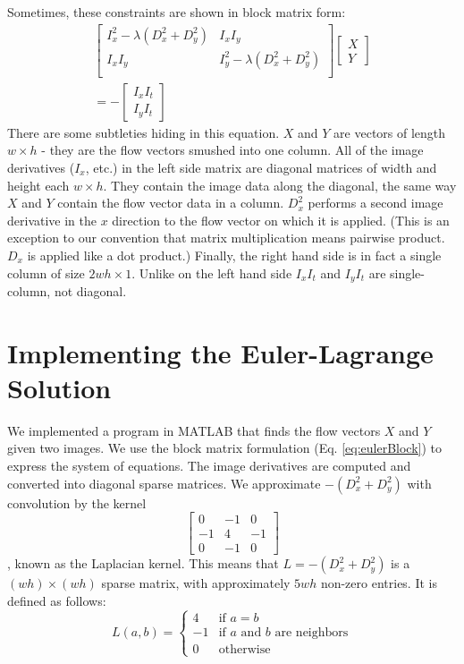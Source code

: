 \documentclass[10pt,twocolumn,letterpaper]{article}
\begin{document}
Sometimes, these constraints are shown in block matrix form:
\begin{multline} \label{eq:eulerBlock}
\left[ \begin{array}{cc}
I_x^2 - \lambda (D_x^2 + D_y^2) & I_x I_y\\
I_x I_y & I_y^2 - \lambda (D_x^2 + D_y^2) \\
\end{array} \right]
\left[\begin{array}{c}
X \\
Y
\end{array} \right] \\
=-\left[ \begin{array}{c}
I_x I_t \\
I_y I_t
\end{array} \right]
\end{multline}
There are some subtleties hiding in this equation.  $X$ and $Y$ are vectors of length $w \times h$ - they are the flow vectors smushed into one column.  All of the image derivatives ($I_x$, etc.) in the left side matrix are diagonal matrices of width and height each $w \times h$.  They contain the image data along the diagonal, the same way $X$ and $Y$ contain the flow vector data in a column.  $D_x^2$ performs a second image derivative in the $x$ direction to the flow vector on which it is applied.  (This is an exception to our convention that matrix multiplication means pairwise product.  $D_x$ is applied like a dot product.)  Finally, the right hand side is in fact a single column of size $2wh \times 1$.  Unlike on the left hand side $I_x I_t$ and $I_y I_t$ are single-column, not diagonal.

\section{Implementing the Euler-Lagrange Solution}

We implemented a program in MATLAB that finds the flow vectors $X$ and $Y$ given two images.  We use the block matrix formulation (Eq. \ref{eq:eulerBlock}) to express the system of equations.  The image derivatives are computed and converted into diagonal sparse matrices.  We approximate $-(D_x^2 + D_y^2)$ with convolution by the kernel
\begin{equation} \label{eq:laplacian}
\left[ \begin{array}{ccc}
0 & -1 & 0 \\
-1 & 4 & -1 \\
0 & -1 & 0
\end{array} \right]
\end{equation}
, known as the Laplacian kernel.  This means that $L = -(D_x^2 + D_y^2)$ is a $(wh) \times (wh)$ sparse matrix, with approximately $5wh$ non-zero entries.  It is defined as follows:
\begin{equation} \label{eq:laplacian2}
L(a, b) = \begin{cases}
4 & \text{if } a = b \\
-1 & \text{if $a$ and $b$ are neighbors} \\
0 & \text{otherwise}
\end{cases}
\end{equation}
\end{document}
